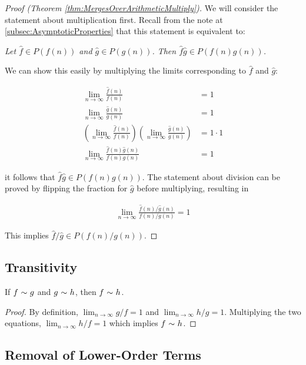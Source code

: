 \begin{proof}[Proof (Theorem \ref{thm:MergesOverArithmeticMultiply})]
	We will consider the statement about multiplication first. Recall from the note at \ref{subsec:AsymptoticProperties} that this statement is equivalent to:
	
	\textit{Let $\hat{f} \in P(f(n))$ and $\hat{g} \in P(g(n))$. Then $\hat{f}\hat{g} \in P(f(n)g(n))$.}
	
	We can show this easily by multiplying the limits corresponding to $\hat{f}$ and $\hat{g}$:
	
	\begin{align*}
	\lim_{n \to \infty} \frac{\hat{f}(n)}{f(n)} &= 1\\
	\lim_{n \to \infty} \frac{\hat{g}(n)}{g(n)} &= 1\\
	\left( \lim_{n \to \infty} \frac{\hat{f}(n)}{f(n)} \right) \left( \lim_{n \to \infty} \frac{\hat{g}(n)}{g(n)} \right) &= 1 \cdot 1\\
	\lim_{n \to \infty} \frac{\hat{f}(n)\hat{g}(n)}{f(n)g(n)} &= 1
	\end{align*}
	
	it follows that $\hat{f}\hat{g} \in P(f(n)g(n))$. The statement about division can be proved by flipping the fraction for $\hat{g}$ before multiplying, resulting in
	
	\begin{align*}
	\lim_{n \to \infty} \frac{\hat{f}(n) / \hat{g}(n)}{f(n) / g(n)} = 1
	\end{align*}
	
	This implies $\hat{f} / \hat{g} \in P(f(n) / g(n))$.
\end{proof}

\subsection{Transitivity}
\label{pf:Transitivity}

\begin{theorem}
	If $f \ \mathtt{\sim}\  g$ and $g \ \mathtt{\sim}\  h$, then $f \ \mathtt{\sim}\  h$.
\end{theorem}

\begin{proof}
	By definition, $\lim_{n \to \infty} g / f = 1$ and $\lim_{n \to \infty} h / g = 1$. Multiplying the two equations, $\lim_{n \to \infty} h / f = 1$ which implies $f \ \mathtt{\sim}\  h$.
\end{proof}

\subsection{Removal of Lower-Order Terms}
\label{pf:RemovesLowerOrderTerms}

